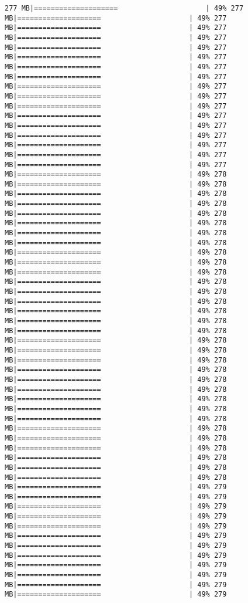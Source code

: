 \documentclass[
]{article}
\begin{document}
\begin{verbatim}
277 MB|====================                     | 49% 277 MB|====================                     | 49% 277 MB|====================                     | 49% 277 MB|====================                     | 49% 277 MB|====================                     | 49% 277 MB|====================                     | 49% 277 MB|====================                     | 49% 277 MB|====================                     | 49% 277 MB|====================                     | 49% 277 MB|====================                     | 49% 277 MB|====================                     | 49% 277 MB|====================                     | 49% 277 MB|====================                     | 49% 277 MB|====================                     | 49% 277 MB|====================                     | 49% 277 MB|====================                     | 49% 277 MB|====================                     | 49% 277 MB|====================                     | 49% 278 MB|====================                     | 49% 278 MB|====================                     | 49% 278 MB|====================                     | 49% 278 MB|====================                     | 49% 278 MB|====================                     | 49% 278 MB|====================                     | 49% 278 MB|====================                     | 49% 278 MB|====================                     | 49% 278 MB|====================                     | 49% 278 MB|====================                     | 49% 278 MB|====================                     | 49% 278 MB|====================                     | 49% 278 MB|====================                     | 49% 278 MB|====================                     | 49% 278 MB|====================                     | 49% 278 MB|====================                     | 49% 278 MB|====================                     | 49% 278 MB|====================                     | 49% 278 MB|====================                     | 49% 278 MB|====================                     | 49% 278 MB|====================                     | 49% 278 MB|====================                     | 49% 278 MB|====================                     | 49% 278 MB|====================                     | 49% 278 MB|====================                     | 49% 278 MB|====================                     | 49% 278 MB|====================                     | 49% 278 MB|====================                     | 49% 278 MB|====================                     | 49% 278 MB|====================                     | 49% 278 MB|====================                     | 49% 278 MB|====================                     | 49% 279 MB|====================                     | 49% 279 MB|====================                     | 49% 279 MB|====================                     | 49% 279 MB|====================                     | 49% 279 MB|====================                     | 49% 279 MB|====================                     | 49% 279 MB|====================                     | 49% 279 MB|====================                     | 49% 279 MB|====================                     | 49% 279 MB|====================                     | 49% 279 MB|====================                     | 49% 279 
\end{verbatim}
\end{document}
